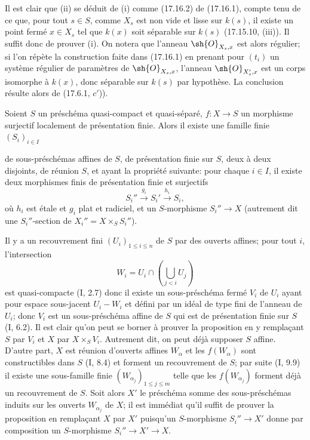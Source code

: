 Il est clair que (ii) se déduit de (i) comme (17.16.2) de (17.16.1), compte tenu de ce que, pour tout $s\in S$, comme $X_s$ est non vide et lisse sur $k(s)$, il existe un point fermé $x\in X_s$ tel que $k(x)$ soit séparable sur $k(s)$ (17.15.10, (iii)). Il suffit donc de prouver (i). On notera que l'anneau $\sh{O}_{X_s,x}$ est alors régulier; si l'on répète la construction faite dans (17.16.1) en prenant pour $(t_i)$ un système régulier de paramètres de $\sh{O}_{X_s,x}$, l'anneau $\sh{O}_{X'_s,x}$ est un corps isomorphe à $k(x)$, donc séparable sur $k(s)$ par hypothèse. La conclusion résulte alors de (17.6.1, $c'$)).

\begin{proposition}[17.16.4]
\label{IV.17.16.4}
Soient $S$ un préschéma quasi-compact et quasi-séparé, $f:X\to S$ un morphisme surjectif localement de présentation finie. Alors il existe une famille finie $(S_i)_{i\in I}$


de sous-préschémas affines de $S$, de présentation finie sur $S$, deux à deux disjoints, de réunion $S$, et ayant la propriété suivante: pour chaque $i\in I$, il existe deux morphismes finis de présentation finie et surjectifs
\[
  S_i''\xrightarrow{g_i}S_i'\xrightarrow{h_i}S_i,
\]
où $h_i$ est étale et $g_i$ plat et radiciel, et un $S$-morphisme $S_i''\to X$ (autrement dit une $S_i''$-section de $X_i''=X\times_S S_i''$).
\end{proposition}

Il y a un recouvrement fini $(U_i)_{1\leq i\leq n}$ de $S$ par des ouverts affines; pour tout $i$, l'intersection
\[
  W_i=U_i\cap\left(\bigcup_{j<i}U_j\right)
\]
est quasi-compacte (I, 2.7) donc il existe un sous-préschéma fermé $V_i$ de $U_i$ ayant pour espace sous-jacent $U_i-W_i$ et défini par un idéal de type fini de l'anneau de $U_i$; donc $V_i$ est un sous-préschéma affine de $S$ qui est de présentation finie sur $S$ (I, 6.2). Il est clair qu'on peut se borner à prouver la proposition en y remplaçant $S$ par $V_i$ et $X$ par $X\times_S V_i$. Autrement dit, on peut déjà supposer $S$ affine. D'autre part, $X$ est réunion d'ouverts affines $W_\alpha$ et les $f(W_\alpha)$ sont constructibles dans $S$ (I, 8.4) et forment un recouvrement de $S$; par suite (I, 9.9) il existe une sous-famille finie $(W_{\alpha_j})_{1\leq j\leq m}$ telle que les $f(W_{\alpha_j})$ forment déjà un recouvrement de $S$. Soit alors $X'$ le préschéma somme des sous-préschémas induits sur les ouverts $W_{\alpha_j}$ de $X$; il est immédiat qu'il suffit de prouver la proposition en remplaçant $X$ par $X'$ puisqu'un $S$-morphisme $S_i''\to X'$ donne par composition un $S$-morphisme $S_i''\to X'\to X$.


